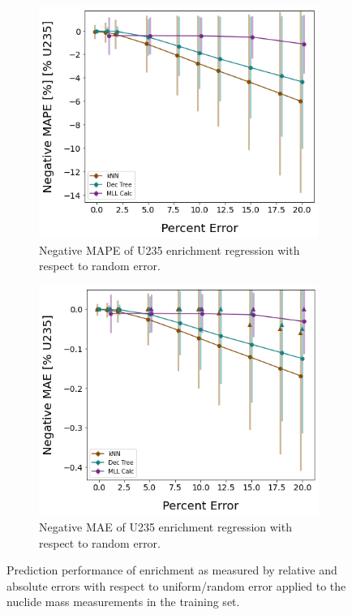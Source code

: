 \begin{figure}[!htb]
  \centering
  \begin{subfigure}[b]{0.49\textwidth}
    \centering
    \includegraphics[width=\textwidth]{./chapters/exp1/randerr_compare_nuc29_MAPE_enri.png}
    \caption{Negative \gls{MAPE} of \gls{U235} enrichment regression with 
             respect to random error.}
    \label{fig:enrimape}
  \end{subfigure}
  \hfill
  \begin{subfigure}[b]{0.49\textwidth}
    \centering
    \includegraphics[width=\textwidth]{./chapters/exp1/randerr_compare_nuc29_MAE_enri.png}
    \caption{Negative \gls{MAE} of \gls{U235} enrichment regression with 
             respect to random error.}
    \label{fig:enrimae}
  \end{subfigure}
  \caption{Prediction performance of enrichment as measured by relative and 
           absolute errors with respect to uniform/random error applied to the 
           nuclide mass measurements in the training set.}
  \label{fig:randenri}
\end{figure}  

